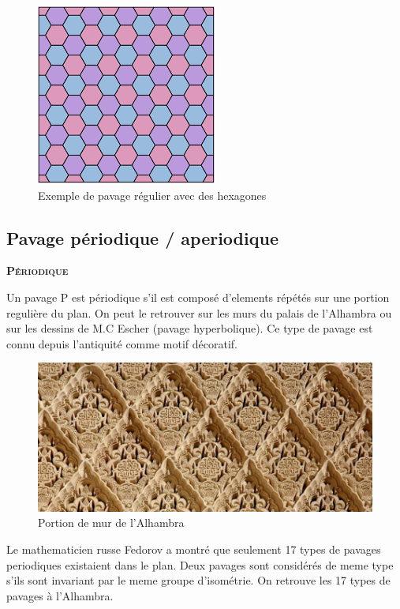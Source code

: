 \documentclass{article}
\begin{document}
\begin{figure} [h]
    \center
    \includegraphics [scale=0.5] {image/pavage_hexagonal.png}
    \caption{Exemple de pavage régulier avec des hexagones}
\end{figure}

\newpage

\subsection{Pavage périodique / aperiodique}

\hspace{1.5cm}

\textbf{\textsc{Périodique}}

Un pavage P est périodique s'il est composé d'elements répétés sur une portion regulière du plan.
On peut le retrouver sur les murs du palais de l'Alhambra ou sur les dessins de M.C Escher (pavage hyperbolique).
Ce type de pavage est connu depuis l’antiquité comme motif décoratif.

\begin{figure} [h]
    \center
    \includegraphics [scale=0.3] {image/Alhambra.jpg}
    \caption{Portion de mur de l'Alhambra}
\end{figure}

Le mathematicien russe Fedorov a montré que seulement 17 types de pavages periodiques existaient dans le plan.
Deux pavages sont considérés de meme type s’ils sont invariant par le meme groupe d’isométrie.
On retrouve les 17 types de pavages à l'Alhambra.
\end{document}
